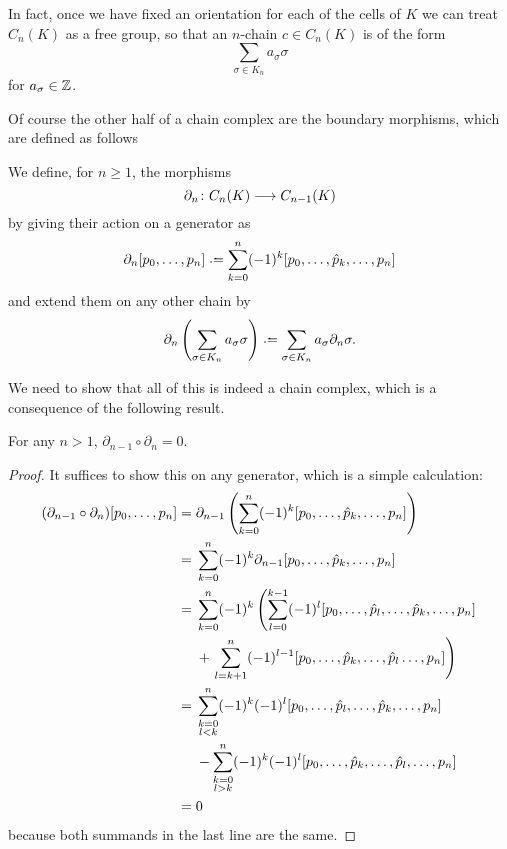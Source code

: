 \documentclass[../main.tex]{subfiles}
\begin{document}
In fact, once we have fixed an orientation for each of the cells of \( K \) we can
treat \( C_n(K) \) as a free group, so that an \( n \)-chain \( c \in C_n(K) \) is of the
form
\begin{equation*}
	\sum_{\sigma \in K_n} a_\sigma \sigma
\end{equation*}
for \( a_\sigma \in \mathbb{Z} \). 

Of course the other half of a chain complex are the boundary morphisms, which are defined
as follows
\begin{definition}
	We define, for \( n \geq 1 \), the morphisms
	\begin{equation*}
		\partial_n \colon C_n(K) \longrightarrow C_{n-1}(K)
	\end{equation*}
	by giving their action on a generator as
	\begin{equation*}
		\partial_n [p_0, \dots, p_n] \defeq \sum_{k = 0}^{n} (-1)^k [p_0, \dots, \hat p_k,
		\dots, p_n]
	\end{equation*}
	and extend them on any other chain by
	\begin{equation*}
		\partial_n\left(\sum_{\sigma \in K_n} a_\sigma \sigma\right) \defeq \sum_{\sigma \in K_n}
		a_\sigma \partial_n \sigma.
	\end{equation*}
\end{definition}
We need to show that all of this is indeed a chain complex, which is a consequence of the
following result.
\begin{lemma}
		For any \( n > 1 \), \( \partial_{n-1} \circ \partial_n = 0 \). 
\end{lemma}
\begin{proof}
	It suffices to show this on any generator, which is a simple calculation:
	\begin{align*}
		(\partial_{n-1} \circ \partial_n)[p_0, \dots, p_n] = {} & \partial_{n-1}\left(\sum_{k
		=		0}^{n}(-1)^k[p_0, \dots, \hat p_k, \dots, p_n]\right) \\
				= {} & \sum_{k = 0}^{n}(-1)^k	\partial_{n-1}[p_0, \dots, \hat	p_k, \dots, p_n] \\
				= {} & \sum_{k = 0}^{n}(-1)^k	\left(\sum_{l = 0}^{k - 1} (-1)^l [p_0, \dots, \hat	p_l, \dots, \hat p_k, \dots, p_n] \right. \\
						 & {} + \left. \sum_{l = k+1}^{n}(-1)^{l-1} [p_0, \dots, \hat p_k, \dots, \hat
						 p_l \dots, p_n]\right) \\
				= {} & \sum_{\mathclap{\substack{k = 0 \\ l < k}}}^n (-1)^k(-1)^l [p_0,	\dots,
				\hat p_l, \dots, \hat p_k, \dots, p_n] \\
						 & {} - \sum_{\mathclap{\substack{k = 0 \\ l > k}}}^n (-1)^k(-1)^l [p_0,
						 \dots, \hat p_k, \dots, \hat p_l, \dots, p_n] \\
				= {} & 0
	\end{align*}
	because both summands in the last line are the same. 
\end{proof}
\end{document}
